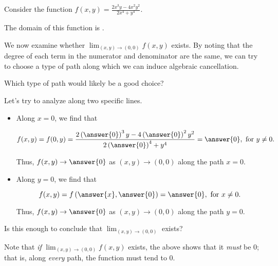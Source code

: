 \documentclass{ximera}
\author{Jim Talamo}
\newcommand{\Lim}[2]{\lim_{#1 \to #2}}
\begin{document}
\begin{exercise}
 
Consider the function $f(x,y) = \frac{2x^3y-4x^2y^2}{2x^4+y^4}$.

The domain of this function is .

We now examine whether $\Lim{(x,y)}{(0,0)} f(x,y)$ exists.  By noting that the degree of each term in the numerator and denominator are the same, we can try to choose a type of path along which we can induce algebraic cancellation.

Which type of path would likely be a good choice?

\begin{multipleChoice}
\end{multipleChoice}

\begin{exercise}
Let's try to analyze along two specific lines.

\begin{itemize}
\item Along $x=0$, we find that 

\[
f(x,y) = f(0,y) =\frac{2\left(\answer{0}\right)^3y-4\left(\answer{0}\right)^2y^2}{2\left(\answer{0}\right)^4+y^4} = \answer{0}, \textrm{ for } y \neq 0.
\]

Thus, $f(x,y) \to \answer{0}$ as $(x,y) \to (0,0)$ along the path $x=0$.

\item Along $y=0$, we find that 

\[
f(x,y) = f\left(\answer{x},\answer{0}\right) = \answer{0} , \textrm{ for } x \neq 0.
\]

Thus, $f(x,y) \to \answer{0}$ as $(x,y) \to (0,0)$ along the path $y=0$.
\end{itemize}

Is this enough to conclude that $\Lim{(x,y)}{(0,0)}$ exists?

\begin{multipleChoice}
\end{multipleChoice}

\begin{exercise}
Note that \emph{if} $\Lim{(x,y)}{(0,0)} f(x,y)$ exists, the above shows that it \emph{must} be $0$; that is, along \emph{every} path, the function must tend to $0$.


\end{exercise}
\end{exercise}
\end{exercise}
\end{document}
